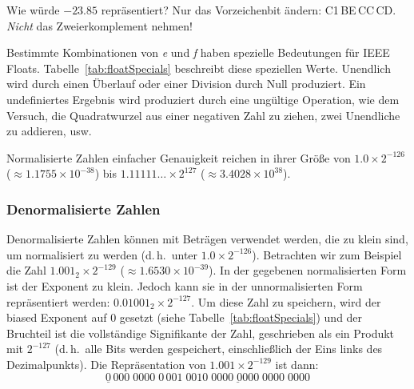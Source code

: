 Wie w\"{u}rde $-23.85$ repr\"{a}sentiert? Nur das Vorzeichenbit \"{a}ndern:
C1\,BE\,\linebreak[1]CC\,CD\@. \emph{Nicht} das Zweierkomplement
nehmen!

\begin{table}[t]
 \caption{Spezielle Werte von \emph{f} und \emph{e}
\label{tab:floatSpecials}}
\end{table}

Bestimmte Kombinationen von \emph{e} und \emph{f} haben spezielle
Bedeutungen f\"{u}r IEEE Floats. Tabelle~\ref{tab:floatSpecials}
beschreibt diese speziellen Werte. Unendlich wird durch einen
\"{U}berlauf oder einer Division durch Null produziert. Ein
undefiniertes Ergebnis wird produziert durch eine ung\"{u}ltige
Operation, wie dem Versuch, die Quadratwurzel aus einer negativen
Zahl zu ziehen, zwei Unendliche zu addieren, usw.

Normalisierte Zahlen einfacher Genauigkeit reichen in ihrer Gr\"{o}{\ss}e
von $1.0 \times 2^{-126}$ ($\approx 1.1755 \times 10^{-38}$) bis
$1.11111\ldots \times 2^{127}$ ($\approx 3.4028 \times 10^{38}$).

\subsubsection{Denormalisierte Zahlen}

Denormalisierte Zahlen k\"{o}nnen mit Betr\"{a}gen verwendet werden, die zu
klein sind, um normalisiert zu werden (d.\,h.\ unter $1.0 \times
2^{-126}$). Betrachten wir zum Beispiel die Zahl $1.001_2 \times
2^{-129}$ ($\approx 1.6530 \times 10^{-39}$). In der gegebenen
normalisierten Form ist der Exponent zu klein. Jedoch kann sie in
der unnormalisierten Form repr\"{a}sentiert werden: $0.01001_2 \times
2^{-127}$. Um diese Zahl zu speichern, wird der biased Exponent auf
0 gesetzt (siehe Tabelle~\ref{tab:floatSpecials}) und der Bruchteil
ist die vollst\"{a}ndige Signifikante der Zahl, geschrieben als ein
Produkt mit $2^{-127}$ (d.\,h.\ alle Bits werden gespeichert,
einschlie{\ss}lich der Eins links des Dezimalpunkts). Die Repr\"{a}sentation
von $1.001 \times 2^{-129}$ ist dann:
\[ \underline{0}\,000\;0000\;0
   \,\underline{001\;0010\;0000\;0000\;0000\;0000} \]


